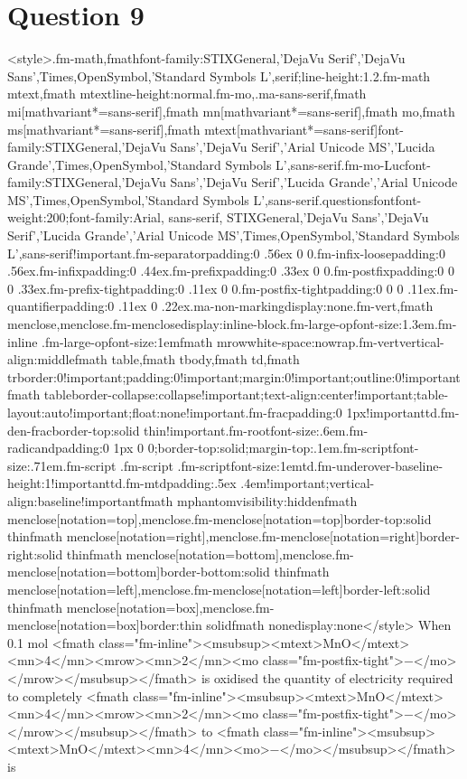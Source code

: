 \documentclass{article}
\begin{document}
\section*{Question 9}
<style>.fm-math,fmath{font-family:STIXGeneral,'DejaVu Serif','DejaVu Sans',Times,OpenSymbol,'Standard Symbols L',serif;line-height:1.2}.fm-math mtext,fmath mtext{line-height:normal}.fm-mo,.ma-sans-serif,fmath mi[mathvariant*=sans-serif],fmath mn[mathvariant*=sans-serif],fmath mo,fmath ms[mathvariant*=sans-serif],fmath mtext[mathvariant*=sans-serif]{font-family:STIXGeneral,'DejaVu Sans','DejaVu Serif','Arial Unicode MS','Lucida Grande',Times,OpenSymbol,'Standard Symbols L',sans-serif}.fm-mo-Luc{font-family:STIXGeneral,'DejaVu Sans','DejaVu Serif','Lucida Grande','Arial Unicode MS',Times,OpenSymbol,'Standard Symbols L',sans-serif}.questionsfont{font-weight:200;font-family:Arial, sans-serif, STIXGeneral,'DejaVu Sans','DejaVu Serif','Lucida Grande','Arial Unicode MS',Times,OpenSymbol,'Standard Symbols L',sans-serif!important}.fm-separator{padding:0 .56ex 0 0}.fm-infix-loose{padding:0 .56ex}.fm-infix{padding:0 .44ex}.fm-prefix{padding:0 .33ex 0 0}.fm-postfix{padding:0 0 0 .33ex}.fm-prefix-tight{padding:0 .11ex 0 0}.fm-postfix-tight{padding:0 0 0 .11ex}.fm-quantifier{padding:0 .11ex 0 .22ex}.ma-non-marking{display:none}.fm-vert,fmath menclose,menclose.fm-menclose{display:inline-block}.fm-large-op{font-size:1.3em}.fm-inline .fm-large-op{font-size:1em}fmath mrow{white-space:nowrap}.fm-vert{vertical-align:middle}fmath table,fmath tbody,fmath td,fmath tr{border:0!important;padding:0!important;margin:0!important;outline:0!important}fmath table{border-collapse:collapse!important;text-align:center!important;table-layout:auto!important;float:none!important}.fm-frac{padding:0 1px!important}td.fm-den-frac{border-top:solid thin!important}.fm-root{font-size:.6em}.fm-radicand{padding:0 1px 0 0;border-top:solid;margin-top:.1em}.fm-script{font-size:.71em}.fm-script .fm-script .fm-script{font-size:1em}td.fm-underover-base{line-height:1!important}td.fm-mtd{padding:.5ex .4em!important;vertical-align:baseline!important}fmath mphantom{visibility:hidden}fmath menclose[notation=top],menclose.fm-menclose[notation=top]{border-top:solid thin}fmath menclose[notation=right],menclose.fm-menclose[notation=right]{border-right:solid thin}fmath menclose[notation=bottom],menclose.fm-menclose[notation=bottom]{border-bottom:solid thin}fmath menclose[notation=left],menclose.fm-menclose[notation=left]{border-left:solid thin}fmath menclose[notation=box],menclose.fm-menclose[notation=box]{border:thin solid}fmath none{display:none}</style> When 0.1 mol <fmath class="fm-inline"><msubsup><mtext>MnO</mtext><mn>4</mn><mrow><mn>2</mn><mo class="fm-postfix-tight">−</mo></mrow></msubsup></fmath> is oxidised the quantity of electricity required to completely <fmath class="fm-inline"><msubsup><mtext>MnO</mtext><mn>4</mn><mrow><mn>2</mn><mo class="fm-postfix-tight">−</mo></mrow></msubsup></fmath> to <fmath class="fm-inline"><msubsup><mtext>MnO</mtext><mn>4</mn><mo>−</mo></msubsup></fmath> is 
\end{document}

